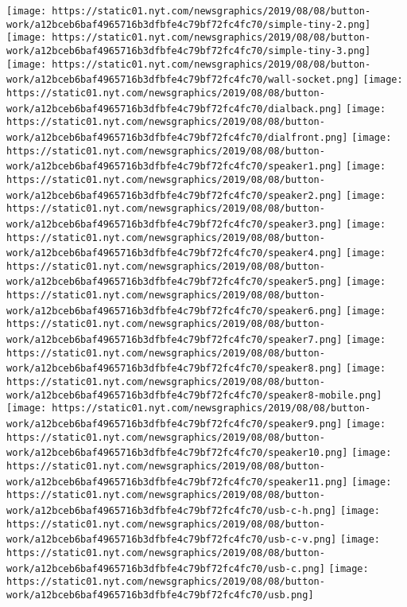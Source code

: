 \texttt{[image: https://static01.nyt.com/newsgraphics/2019/08/08/button-work/a12bceb6baf4965716b3dfbfe4c79bf72fc4fc70/simple-tiny-2.png]}
\texttt{[image: https://static01.nyt.com/newsgraphics/2019/08/08/button-work/a12bceb6baf4965716b3dfbfe4c79bf72fc4fc70/simple-tiny-3.png]}
\texttt{[image: https://static01.nyt.com/newsgraphics/2019/08/08/button-work/a12bceb6baf4965716b3dfbfe4c79bf72fc4fc70/wall-socket.png]}
\texttt{[image: https://static01.nyt.com/newsgraphics/2019/08/08/button-work/a12bceb6baf4965716b3dfbfe4c79bf72fc4fc70/dialback.png]}
\texttt{[image: https://static01.nyt.com/newsgraphics/2019/08/08/button-work/a12bceb6baf4965716b3dfbfe4c79bf72fc4fc70/dialfront.png]}
\texttt{[image: https://static01.nyt.com/newsgraphics/2019/08/08/button-work/a12bceb6baf4965716b3dfbfe4c79bf72fc4fc70/speaker1.png]}
\texttt{[image: https://static01.nyt.com/newsgraphics/2019/08/08/button-work/a12bceb6baf4965716b3dfbfe4c79bf72fc4fc70/speaker2.png]}
\texttt{[image: https://static01.nyt.com/newsgraphics/2019/08/08/button-work/a12bceb6baf4965716b3dfbfe4c79bf72fc4fc70/speaker3.png]}
\texttt{[image: https://static01.nyt.com/newsgraphics/2019/08/08/button-work/a12bceb6baf4965716b3dfbfe4c79bf72fc4fc70/speaker4.png]}
\texttt{[image: https://static01.nyt.com/newsgraphics/2019/08/08/button-work/a12bceb6baf4965716b3dfbfe4c79bf72fc4fc70/speaker5.png]}
\texttt{[image: https://static01.nyt.com/newsgraphics/2019/08/08/button-work/a12bceb6baf4965716b3dfbfe4c79bf72fc4fc70/speaker6.png]}
\texttt{[image: https://static01.nyt.com/newsgraphics/2019/08/08/button-work/a12bceb6baf4965716b3dfbfe4c79bf72fc4fc70/speaker7.png]}
\texttt{[image: https://static01.nyt.com/newsgraphics/2019/08/08/button-work/a12bceb6baf4965716b3dfbfe4c79bf72fc4fc70/speaker8.png]}
\texttt{[image: https://static01.nyt.com/newsgraphics/2019/08/08/button-work/a12bceb6baf4965716b3dfbfe4c79bf72fc4fc70/speaker8-mobile.png]}
\texttt{[image: https://static01.nyt.com/newsgraphics/2019/08/08/button-work/a12bceb6baf4965716b3dfbfe4c79bf72fc4fc70/speaker9.png]}
\texttt{[image: https://static01.nyt.com/newsgraphics/2019/08/08/button-work/a12bceb6baf4965716b3dfbfe4c79bf72fc4fc70/speaker10.png]}
\texttt{[image: https://static01.nyt.com/newsgraphics/2019/08/08/button-work/a12bceb6baf4965716b3dfbfe4c79bf72fc4fc70/speaker11.png]}
\texttt{[image: https://static01.nyt.com/newsgraphics/2019/08/08/button-work/a12bceb6baf4965716b3dfbfe4c79bf72fc4fc70/usb-c-h.png]}
\texttt{[image: https://static01.nyt.com/newsgraphics/2019/08/08/button-work/a12bceb6baf4965716b3dfbfe4c79bf72fc4fc70/usb-c-v.png]}
\texttt{[image: https://static01.nyt.com/newsgraphics/2019/08/08/button-work/a12bceb6baf4965716b3dfbfe4c79bf72fc4fc70/usb-c.png]}
\texttt{[image: https://static01.nyt.com/newsgraphics/2019/08/08/button-work/a12bceb6baf4965716b3dfbfe4c79bf72fc4fc70/usb.png]}

